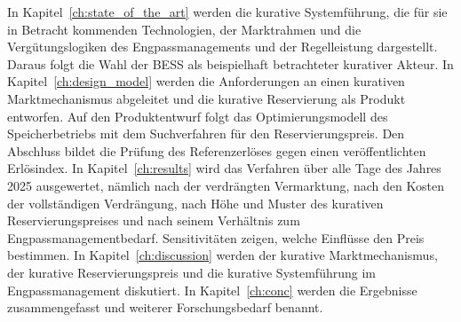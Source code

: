 In Kapitel~\ref{ch:state_of_the_art} werden die kurative Systemführung, die für sie in Betracht kommenden Technologien, der Marktrahmen und die Vergütungslogiken des Engpassmanagements und der Regelleistung dargestellt.
Daraus folgt die Wahl der \ac{BESS} als beispielhaft betrachteter kurativer Akteur.
In Kapitel~\ref{ch:design_model} werden die Anforderungen an einen kurativen Marktmechanismus abgeleitet und die kurative Reservierung als Produkt entworfen.
Auf den Produktentwurf folgt das Optimierungsmodell des Speicherbetriebs mit dem Suchverfahren für den Reservierungspreis.
Den Abschluss bildet die Prüfung des Referenzerlöses gegen einen veröffentlichten Erlösindex.
In Kapitel~\ref{ch:results} wird das Verfahren über alle Tage des Jahres 2025 ausgewertet, nämlich nach der verdrängten Vermarktung, nach den Kosten der vollständigen Verdrängung, nach Höhe und Muster des kurativen Reservierungspreises und nach seinem Verhältnis zum Engpassmanagementbedarf.
Sensitivitäten zeigen, welche Einflüsse den Preis bestimmen.
In Kapitel~\ref{ch:discussion} werden der kurative Marktmechanismus, der kurative Reservierungspreis und die kurative Systemführung im Engpassmanagement diskutiert.
In Kapitel~\ref{ch:conc} werden die Ergebnisse zusammengefasst und weiterer Forschungsbedarf benannt.